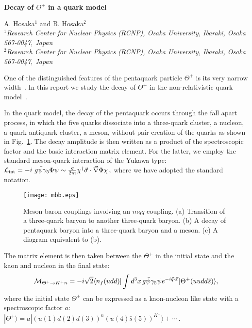\documentclass{annurep}
\newcommand{\beq}{\begin{eqnarray}}
\newcommand{\eeq}{\end{eqnarray}}
\newcommand{\ket}{\rangle}
\newcommand{\bra}{\langle}
\newcommand{\Thep}{\Theta^+}
\begin{document}
%
\begin{center}
{\large \bf Decay of $\Thep$ in a quark model}
\vspace*{0.3cm}

A. Hosaka$^{1}$ and B. Hosaka$^{2}$\\
$^{1}${\it Research Center for Nuclear Physics (RCNP), Osaka University,
Ibaraki, Osaka 567-0047, Japan}\\
$^{2}${\it Research Center for Nuclear Physics (RCNP), Osaka University,
Ibaraki, Osaka 567-0047, Japan}\\
\end{center}

\vspace*{0.5cm}
%
%
One of the distinguished features of the pentaquark particle 
$\Theta^+$ is its very narrow width~\cite{penta}.  
In this report we study the decay of $\Thep$ in the 
non-relativistic quark model~\cite{hos}.  

In the quark model, 
the decay of the pentaquark 
occurs through the fall apart process, in which the 
five quarks dissociate into a three-quark cluster, a nucleon, 
a quark-antiquark cluster, a meson, 
without pair creation of the 
quarks
as shown in Fig.~\ref{fallapart}.  
The decay amplitude is then written as a product of the 
spectroscopic factor 
and the basic interaction matrix element. 
For the latter, we employ the standard 
meson-quark interaction of the Yukawa type:
$
{\cal L}_{\rm int} 
=
-i\ g \bar \psi \gamma_5 \Phi \psi 
\sim 
\frac{g}{2m} \chi^\dagger \vec \sigma \cdot \vec \nabla \Phi \chi
\, , 
$
where we have adopted the standard notation.   

\begin{figure}[h]
\centering
\texttt{[image: mbb.eps]}
\caption{
Meson-baron couplings involving an $mqq$ coupling. 
(a) Transition of a three-quark baryon to another three-quark baryon.
(b) A decay of pentaquark baryon into a three-quark baryon and a meson.
(c) A diagram equivalent to (b).}
\label{fallapart}
\end{figure}

The matrix element is then taken between the 
$\Thep$ in the initial state and the kaon and nucleon in the 
final state:
\beq
{\cal M}_{\Theta^+ \to K^+ n} =
-i \sqrt{2} 
\bra n_f(udd) |  
 \int d^3 x \, g \bar \psi \gamma_5 \psi
e^{-i \vec q \cdot \vec x} 
|\Thep(uudd\bar s)\ket ,
\label{calM1}
\eeq
where the initial state $\Thep$ can be expressed as 
a kaon-nucleon like state with a spectroscopic factor $a$:
$
|\Thep\ket = a |(u(1)d(2)d(3))^n (u(4)\bar s(5))^{K^+}\ket 
+ \cdots \, .
$
\end{document}
